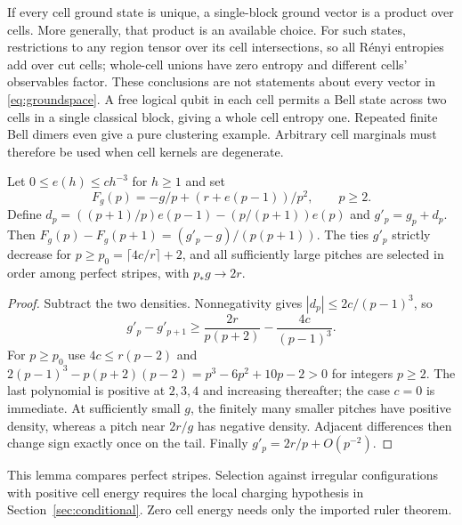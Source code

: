 If every cell ground state is unique, a single-block ground vector is
a product over cells. More generally, that product is an available
choice. For such states, restrictions to any region tensor over its
cell intersections, so all R\'enyi entropies add over cut cells;
whole-cell unions have zero entropy and different cells' observables
factor. These conclusions are not statements about every vector in
\eqref{eq:groundspace}. A free logical qubit in each cell permits a
Bell state across two cells in a single classical block, giving a
whole cell entropy one. Repeated finite Bell dimers even give a pure
clustering example. Arbitrary cell marginals must therefore be used
when cell kernels are degenerate.

\begin{lemma}\label{lem:shifted}
Let $0\leq e(h)\leq ch^{-3}$ for $h\geq1$ and set
\[
 F_g(p)=-g/p+(r+e(p-1))/p^2,\qquad p\geq2.
\]
Define $d_p=((p+1)/p)e(p-1)-(p/(p+1))e(p)$ and $g'_p=g_p+d_p$.
Then $F_g(p)-F_g(p+1)=(g'_p-g)/(p(p+1))$.
The ties $g'_p$ strictly decrease for
$p\geq p_0=\lceil4c/r\rceil+2$, and all sufficiently large pitches
are selected in order among perfect stripes, with $p_*g\to2r$.
\end{lemma}
\begin{proof}
Subtract the two densities. Nonnegativity gives
$|d_p|\leq2c/(p-1)^3$, so
\[
 g'_p-g'_{p+1}\geq\frac{2r}{p(p+2)}-\frac{4c}{(p-1)^3}.
\]
For $p\geq p_0$ use $4c\leq r(p-2)$ and
$2(p-1)^3-p(p+2)(p-2)=p^3-6p^2+10p-2>0$ for integers $p\geq2$.
The last polynomial is positive at $2,3,4$ and increasing thereafter;
the case $c=0$ is immediate. At sufficiently small $g$, the finitely
many smaller pitches have positive density, whereas a pitch near
$2r/g$ has negative density. Adjacent differences then change sign
exactly once on the tail. Finally $g'_p=2r/p+O(p^{-2})$.
\end{proof}

This lemma compares perfect stripes. Selection against irregular
configurations with positive cell energy requires the local charging
hypothesis in Section~\ref{sec:conditional}. Zero cell energy needs
only the imported ruler theorem.
